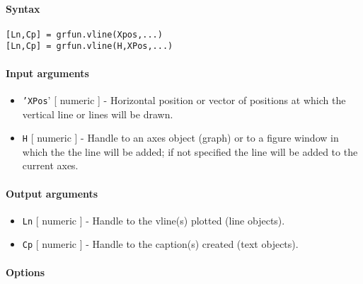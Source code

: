 


	\paragraph{Syntax}\label{syntax}

\begin{verbatim}
[Ln,Cp] = grfun.vline(Xpos,...)
[Ln,Cp] = grfun.vline(H,XPos,...)
\end{verbatim}

\paragraph{Input arguments}\label{input-arguments}

\begin{itemize}
\item
  \texttt{'XPos}' {[} numeric {]} - Horizontal position or vector of
  positions at which the vertical line or lines will be drawn.
\item
  \texttt{H} {[} numeric {]} - Handle to an axes object (graph) or to a
  figure window in which the the line will be added; if not specified
  the line will be added to the current axes.
\end{itemize}

\paragraph{Output arguments}\label{output-arguments}

\begin{itemize}
\item
  \texttt{Ln} {[} numeric {]} - Handle to the vline(s) plotted (line
  objects).
\item
  \texttt{Cp} {[} numeric {]} - Handle to the caption(s) created (text
  objects).
\end{itemize}

\paragraph{Options}\label{options}


